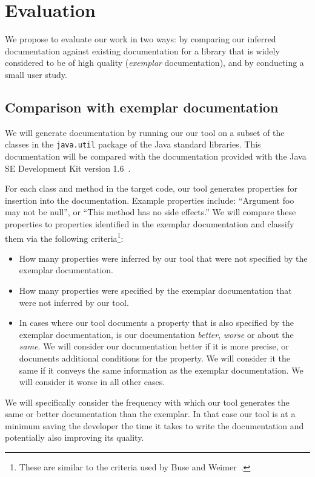 \section{Evaluation}

We propose to evaluate our work in two ways: by comparing our inferred
documentation against existing documentation for a library that is widely
considered to be of high quality (\textit{exemplar} documentation), and by
conducting a small user study.

\subsection{Comparison with exemplar documentation}

We will generate documentation by running our our tool on a subset of the
classes in the \texttt{java.util} package of the Java standard libraries. This
documentation will be compared with the documentation provided with the
Java SE Development Kit version 1.6~\cite{JDK6}.

For each class and method in the target code, our tool generates properties for
insertion into the documentation. Example properties include: ``Argument foo
may not be null'', or ``This method has no side effects.'' We will compare
these properties to properties identified in the exemplar documentation and
classify them via the following criteria\footnote{These are similar to the
criteria used by Buse and Weimer~\cite{autodoc}.}:

\begin{itemize}
\item How many properties were inferred by our tool that were not specified by
  the exemplar documentation.
\item How many properties were specified by the exemplar documentation that
  were not inferred by our tool.
\item In cases where our tool documents a property that is also specified by
  the exemplar documentation, is our documentation \textit{better},
  \textit{worse} or about the \textit{same}. We will consider our documentation
  better if it is more precise, or documents additional conditions for the
  property. We will consider it the same if it conveys the same information as
  the exemplar documentation. We will consider it worse in all other cases.
\end{itemize}

We will specifically consider the frequency with which our tool generates the
same or better documentation than the exemplar. In that case our tool is at a
minimum saving the developer the time it takes to write the documentation and
potentially also improving its quality.

